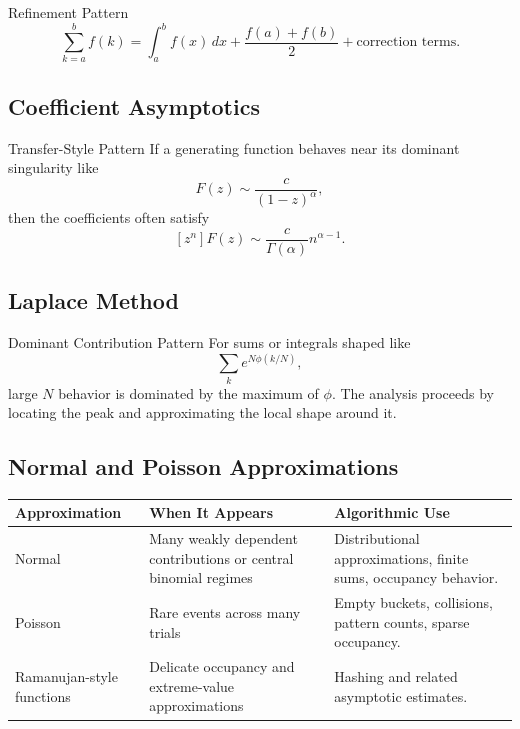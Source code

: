 \documentclass[11pt]{article}
\begin{document}
\begin{mathbox}{Refinement Pattern}
\[
\sum_{k=a}^{b} f(k)
=\int_a^b f(x)\,dx + \frac{f(a)+f(b)}{2}+\text{correction terms}.
\]
\end{mathbox}

\subsection{Coefficient Asymptotics}

\begin{mathbox}{Transfer-Style Pattern}
If a generating function behaves near its dominant singularity like
\[
F(z)\sim \frac{c}{(1-z)^\alpha},
\]
then the coefficients often satisfy
\[
[z^n]F(z)\sim \frac{c}{\Gamma(\alpha)}n^{\alpha-1}.
\]
\end{mathbox}

\subsection{Laplace Method}

\begin{mathbox}{Dominant Contribution Pattern}
For sums or integrals shaped like
\[
\sum_k e^{N\phi(k/N)},
\]
large \(N\) behavior is dominated by the maximum of \(\phi\). The analysis proceeds by locating the peak and approximating the local shape around it.
\end{mathbox}

\subsection{Normal and Poisson Approximations}

\begin{center}
\begin{tabularx}{\textwidth}{L{0.26\textwidth} Y Y}
\toprule
\textbf{Approximation} & \textbf{When It Appears} & \textbf{Algorithmic Use} \\
\midrule
Normal & Many weakly dependent contributions or central binomial regimes & Distributional approximations, finite sums, occupancy behavior. \\
Poisson & Rare events across many trials & Empty buckets, collisions, pattern counts, sparse occupancy. \\
Ramanujan-style functions & Delicate occupancy and extreme-value approximations & Hashing and related asymptotic estimates. \\
\bottomrule
\end{tabularx}
\end{center}
\end{document}
